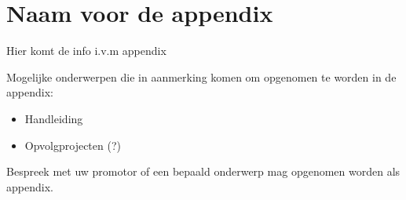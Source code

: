 \chapter{Naam voor de appendix}
\label{chap_app1}

Hier komt de info i.v.m appendix

Mogelijke onderwerpen die in aanmerking komen om opgenomen te worden in de appendix:

\begin{itemize}
 \item Handleiding
 \item Opvolgprojecten (?)
\end{itemize}


Bespreek met uw promotor of een bepaald onderwerp mag opgenomen worden als appendix.

 